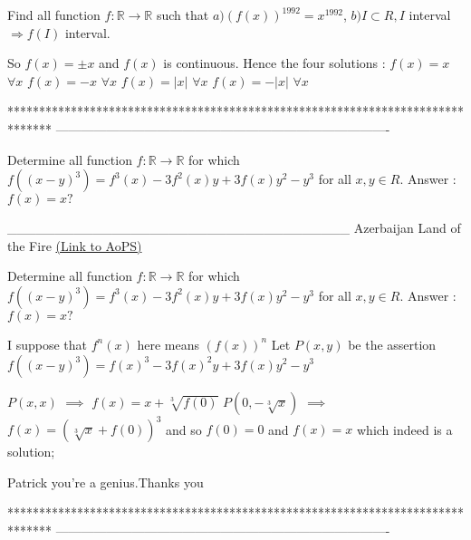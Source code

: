 \begin{solution}
	\begin{tcolorbox}Find all function $f: \mathbb{R}\to\mathbb{R}$ such that $a)(f(x))^{1992}=x^{1992}$, $b)I{\subset}R,I$ interval ${\Rightarrow}f(I)$ interval.\end{tcolorbox}
So $f(x)=\pm x$ and $f(x)$ is continuous. Hence the four solutions :
$f(x)=x$ $\forall x$
$f(x)=-x$ $\forall x$
$f(x)=|x|$ $\forall x$
$f(x)=-|x|$ $\forall x$
\end{solution}
*******************************************************************************
-------------------------------------------------------------------------------

\begin{problem}
	Determine all function $f: \mathbb{R}\to\mathbb{R}$ for which $f((x-y)^3)=f^3(x)-3f^2(x)y+3f(x)y^2-y^3$ for all $x,y{\in}R$. Answer :$f(x)=x?$


____________________________________
Azerbaijan Land of the Fire 
	\flushright \href{https://artofproblemsolving.com/community/c6h531680}{(Link to AoPS)}
\end{problem}



\begin{solution}
	\begin{tcolorbox}Determine all function $f: \mathbb{R}\to\mathbb{R}$ for which $f((x-y)^3)=f^3(x)-3f^2(x)y+3f(x)y^2-y^3$ for all $x,y{\in}R$. Answer :$f(x)=x?$\end{tcolorbox}
I suppose that $f^n(x)$ here means $\left(f(x)\right)^n$
Let $P(x,y)$ be the assertion $f((x-y)^3)=f(x)^3-3f(x)^2y+3f(x)y^2-y^3$

$P(x,x)$ $\implies$ $f(x)=x+\sqrt[3]{f(0)}$
$P(0,-\sqrt[3]x)$ $\implies$ $f(x)=(\sqrt[3]x+f(0))^3$ 
and so $f(0)=0$ and $\boxed{f(x)=x}$ which indeed is a solution;
\end{solution}



\begin{solution}
	Patrick you're a genius.Thanks you  
\end{solution}
*******************************************************************************
-------------------------------------------------------------------------------

